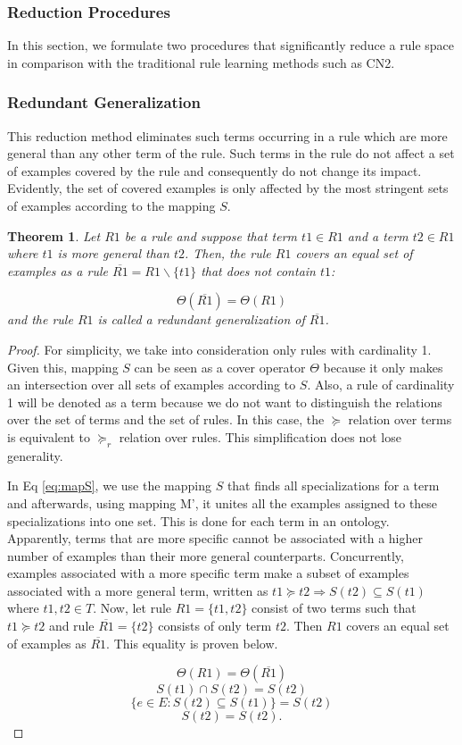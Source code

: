 \documentclass{bmcart}
\newtheorem{theorem}{Theorem}
\begin{document}
\subsubsection*{Reduction Procedures}\label{sec:reduction_procedures}
In this section, we formulate two procedures that significantly reduce a rule space in comparison with the traditional rule learning methods such as CN2.

\subsubsection*{Redundant Generalization}
This reduction method eliminates such terms occurring in a rule which are more general than any other term of the rule. Such terms in the rule do not affect a set of examples covered by the rule and consequently do not change its impact. Evidently, the set of covered examples is only affected by the most stringent sets of examples according to the mapping $S$.
\begin{theorem}
Let $R1$ be a rule and suppose that term $t1 \in R1$ and a term $t2 \in R1$ where $t1$ is more general than $t2$. Then, the rule $R1$ covers an equal set of examples as a rule $\overline{R1} = R1 \backslash \{t1\}$ that does not contain $t1$: 

$$\Theta(\overline{R1}) = \Theta(R1)$$
and the rule $R1$ is called a \textit{redundant generalization} of $\overline{R1}$.
\end{theorem}

\begin{proof}

For simplicity, we take into consideration only rules with cardinality 1. Given this, mapping $S$ can be seen as a cover operator $\Theta$ because it only makes an intersection over all sets of examples according to $S$. Also, a rule of cardinality 1 will be denoted as a term because we do not want to distinguish the relations over the set of terms and the set of rules. In this case, the $\succeq$ relation over terms is equivalent to $\succeq_{r}$ relation over rules. This simplification does not lose generality.

In Eq \ref{eq:mapS}, we use the mapping $S$ that finds all specializations for a term and afterwards, using mapping M', it unites all the examples assigned to these specializations into one set. This is done for each term in an ontology. Apparently, terms that are more specific cannot be associated with a higher number of examples than their more general counterparts. Concurrently, examples associated with a more specific term make a subset of examples associated with a more general term, written as $t1 \succeq t2 \Rightarrow S(t2) \subseteq S(t1)$ where $t1,t2 \in T$.
Now, let rule $R1=\{t1,t2\}$ consist of two terms such that $t1 \succeq t2$ and rule $\overline{R1} = \{t2\}$ consists of only term $t2$. Then $R1$ covers an equal set of examples as $\overline{R1}$. This equality is proven below.

$$ \Theta(R1) = \Theta(\overline{R1})$$
$$S(t1) \cap S(t2) = S(t2)$$
$$\{e \in E: S(t2) \subseteq S(t1)\} = S(t2)$$
$$S(t2) = S(t2).$$
\end{proof}
\end{document}
